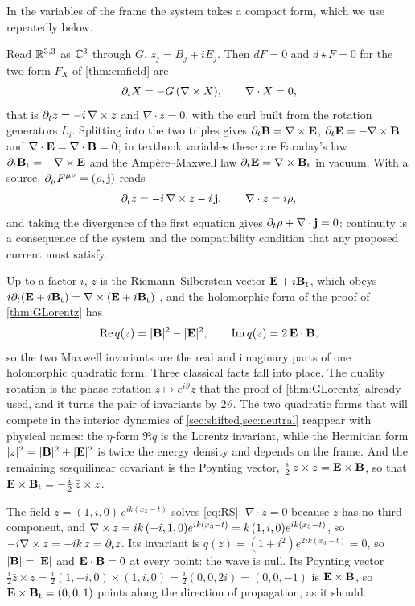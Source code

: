 In the variables of the frame the system takes a compact form, which we use repeatedly below.

\begin{proposition}
\label{prop:RS}
Read $\mathbb{R}^{3,3}$ as $\mathbb{C}^3$ through $G$, $z_j=B_j+iE_j$. Then $dF=0$ and $d\star F=0$ for the two-form $F_X$ of
\cref{thm:emfield} are
\begin{equation}
\label{eq:RS}
\partial_tX=-G\,(\nabla\times X),\qquad \nabla\cdot X=0,
\end{equation}
that is $\partial_tz=-i\,\nabla\times z$ and $\nabla\cdot z=0$, with the curl built from the rotation generators $L_i$. Splitting into the
two triples gives $\partial_t\mathbf B=\nabla\times\mathbf E$, $\partial_t\mathbf E=-\nabla\times\mathbf B$ and $\nabla\cdot\mathbf E=\nabla\cdot\mathbf B=0$; in textbook variables these
are Faraday's law $\partial_t\mathbf B_{\rm t}=-\nabla\times\mathbf E$ and the Amp\`ere--Maxwell law $\partial_t\mathbf E=\nabla\times\mathbf B_{\rm t}$ in vacuum. With a source,
$\partial_\mu F^{\mu\nu}=(\rho,\mathbf j)$ reads
\begin{equation}
\label{eq:RSsource}
\partial_tz=-i\,\nabla\times z-i\,\mathbf j,\qquad \nabla\cdot z=i\rho ,
\end{equation}
and taking the divergence of the first equation gives $\partial_t\rho+\nabla\cdot\mathbf j=0$: continuity is a consequence of the system and
the compatibility condition that any proposed current must satisfy.
\end{proposition}

Up to a factor $i$, $z$ is the Riemann--Silberstein vector $\mathbf E+i\mathbf B_{\rm t}$, which obeys
$i\partial_t(\mathbf E+i\mathbf B_{\rm t})=\nabla\times(\mathbf E+i\mathbf B_{\rm t})$ \cite{Silberstein1907,BialynickiBirula13}, and the holomorphic form of the proof of
\cref{thm:GLorentz} has
\[
\operatorname{Re} q(z)=|\mathbf B|^2-|\mathbf E|^2,\qquad \operatorname{Im} q(z)=2\,\mathbf E\cdot\mathbf B ,
\]
so the two Maxwell invariants are the real and imaginary parts of one holomorphic quadratic form. Three classical facts fall into
place. The duality rotation is the phase rotation $z\mapsto e^{i\vartheta}z$ that the proof of \cref{thm:GLorentz} already used, and
it turns the pair of invariants by $2\vartheta$. The two quadratic forms that will compete in the interior dynamics of
\cref{sec:shifted,sec:neutral} reappear with physical names: the $\eta$-form $\Re q$ is the Lorentz invariant, while the Hermitian
form $|z|^2=|\mathbf B|^2+|\mathbf E|^2$ is twice the energy density and depends on the frame. And the remaining sesquilinear covariant is the
Poynting vector, $\tfrac i2\,\bar z\times z=\mathbf E\times\mathbf B$, so that $\mathbf E\times\mathbf B_{\rm t}=-\tfrac i2\,\bar z\times z$.

\begin{example}
\label{ex:circular}
The field $z=(1,i,0)\,e^{ik(x_3-t)}$ solves \eqref{eq:RS}: $\nabla\cdot z=0$ because $z$ has no third component, and
$\nabla\times z=ik\,(-i,1,0)e^{ik(x_3-t)}=k\,(1,i,0)e^{ik(x_3-t)}$, so $-i\nabla\times z=-ik\,z=\partial_tz$. Its invariant is
$q(z)=(1+i^2)e^{2ik(x_3-t)}=0$, so $|\mathbf B|=|\mathbf E|$ and $\mathbf E\cdot\mathbf B=0$ at every point: the wave is null. Its Poynting vector
$\tfrac i2\bar z\times z=\tfrac i2(1,-i,0)\times(1,i,0)=\tfrac i2(0,0,2i)=(0,0,-1)$ is $\mathbf E\times\mathbf B$, so $\mathbf E\times\mathbf B_{\rm t}=(0,0,1)$
points along the direction of propagation, as it should.
\end{example}

